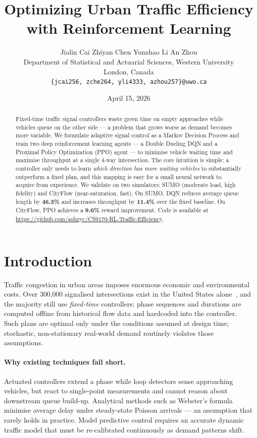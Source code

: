 \documentclass[10pt]{article}
\title{\textbf{Optimizing Urban Traffic Efficiency with Reinforcement Learning}}
\author{
  Jialin Cai \quad Zhiyan Chen \quad Yunzhao Li \quad An Zhou \\[4pt]
  Department of Statistical and Actuarial Sciences, Western University \\
  London, Canada \\
  \texttt{\{jcai256, zche264, yli4333, azhou257\}@uwo.ca}
}
\date{April 15, 2026}
\begin{document}
\maketitle

\begin{abstract}
Fixed-time traffic signal controllers waste green time on empty approaches
while vehicles queue on the other side — a problem that grows worse as demand
becomes more variable.  We formulate adaptive signal control as a Markov
Decision Process and train two deep reinforcement learning agents — a Double
Dueling DQN and a Proximal Policy Optimization (PPO) agent — to minimise
vehicle waiting time and maximise throughput at a single 4-way intersection.
The core intuition is simple: a controller only needs to learn \emph{which
direction has more waiting vehicles} to substantially outperform a fixed plan,
and this mapping is easy for a small neural network to acquire from experience.
We validate on two simulators: SUMO (moderate load, high fidelity) and CityFlow
(near-saturation, fast).  On SUMO, DQN reduces average queue length by
\textbf{46.3\%} and increases throughput by \textbf{11.4\%} over the fixed
baseline.  On CityFlow, PPO achieves a \textbf{9.6\%} reward improvement.
Code is available at \url{https://github.com/ashzyc/CS9170-RL-Traffic-Efficiency}.
\end{abstract}

\section{Introduction}

Traffic congestion in urban areas imposes enormous economic and environmental
costs.  Over 300,000 signalised intersections exist in the United States
alone~\citep{schrank2021tti}, and the majority still use \emph{fixed-time}
controllers: phase sequences and durations are computed offline from historical
flow data and hardcoded into the controller.  Such plans are optimal only under
the conditions assumed at design time; stochastic, non-stationary real-world
demand routinely violates those assumptions.

\paragraph{Why existing techniques fall short.}
Actuated controllers extend a phase while loop detectors sense approaching
vehicles, but react to single-point measurements and cannot reason about
downstream queue build-up.  Analytical methods such as Webster's
formula~\citep{webster1958} minimise average delay under steady-state Poisson
arrivals — an assumption that rarely holds in practice.  Model predictive
control requires an accurate dynamic traffic model that must be re-calibrated
continuously as demand patterns shift.
\end{document}
